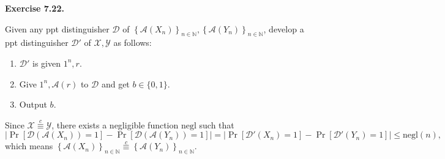 \documentclass[a4paper]{article}
\newenvironment{exercise}[1]{
	\par
	\noindent\textbf{Exercise #1.}\quad
}{
	\par
	\bigskip
}
\newcommand{\abs}[1]{\left| #1 \right|}
\newcommand{\cbra}[1]{\left\{ #1 \right\}}
\newcommand{\sbra}[1]{\left[ #1 \right]}
\newcommand{\bin}{\{0,1\}}
\newcommand{\negl}{\mathrm{negl}}
\newcommand{\ppt}{{\sc ppt} }
\newcommand{\Acal}{\mathcal{A}}
\newcommand{\Xcal}{\mathcal{X}}
\newcommand{\Ycal}{\mathcal{Y}}
\newcommand{\Dcal}{\mathcal{D}}
\begin{document}
\begin{exercise}{7.22}
    Given any \ppt distinguisher $\Dcal$ of $\cbra{\Acal(X_n)}_{n\in\mathbb N},\cbra{\Acal(Y_n)}_{n\in\mathbb N}$, 
    develop a \ppt distinguisher
    $\Dcal'$ of $\Xcal,\Ycal$ as follows:
    \begin{enumerate}
        \item $\Dcal'$ is given $1^n,r$.
        \item Give $1^n,\Acal(r)$ to $\Dcal$ and get $b\in\bin$.
        \item Output $b$.
    \end{enumerate}
    Since $\Xcal\overset{c}{\equiv}\Ycal$, there exists a negligible function $\negl$ such that
    $$
        \abs{\Pr\sbra{\Dcal(\Acal(X_n))=1}-\Pr\sbra{\Dcal(\Acal(Y_n))=1}}
        =\abs{\Pr\sbra{\Dcal'(X_n)=1}-\Pr\sbra{\Dcal'(Y_n)=1}}
        \leq\negl(n),
    $$
    which means $\cbra{\Acal(X_n)}_{n\in\mathbb N}\overset{c}{\equiv}\cbra{\Acal(Y_n)}_{n\in\mathbb N}$.
\end{exercise}
\end{document}
